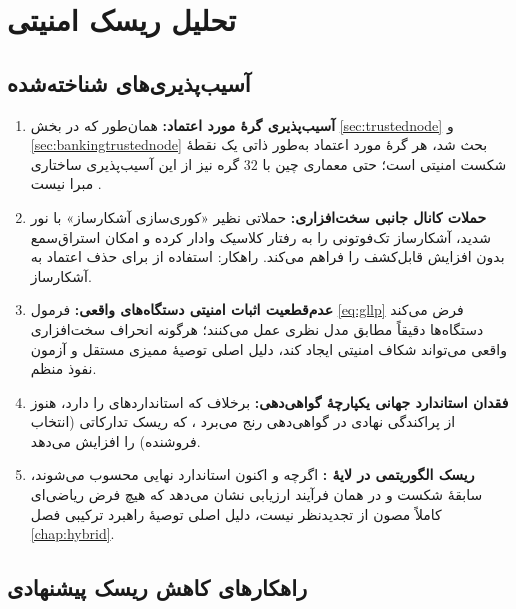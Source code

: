 \chapter{تحلیل ریسک امنیتی}
\label{chap:security}

\section{آسیب‌پذیری‌های شناخته‌شده}

\begin{enumerate}
\item \textbf{آسیب‌پذیری گرهٔ مورد اعتماد:} همان‌طور که در بخش \ref{sec:trustednode} و \ref{sec:bankingtrustednode} بحث شد، هر گرهٔ مورد اعتماد به‌طور ذاتی یک نقطهٔ شکست امنیتی است؛ حتی معماری چین با $32$ گره نیز از این آسیب‌پذیری ساختاری مبرا نیست \Cite{iiss2026governance}.
\item \textbf{حملات کانال جانبی سخت‌افزاری:} حملاتی نظیر «کوری‌سازی آشکارساز»  با نور شدید، آشکارساز تک‌فوتونی را به رفتار کلاسیک وادار کرده و امکان استراق‌سمع بدون افزایش قابل‌کشف  را فراهم می‌کند. راهکار: استفاده از  برای حذف اعتماد به آشکارساز.
\item \textbf{عدم‌قطعیت اثبات امنیتی دستگاه‌های واقعی:} فرمول \ref{eq:gllp} فرض می‌کند دستگاه‌ها دقیقاً مطابق مدل نظری عمل می‌کنند؛ هرگونه انحراف سخت‌افزاری واقعی می‌تواند شکاف امنیتی ایجاد کند، دلیل اصلی توصیهٔ ممیزی مستقل و آزمون نفوذ منظم.
\item \textbf{فقدان استاندارد جهانی یکپارچهٔ گواهی‌دهی:} برخلاف  که استانداردهای  را دارد،  هنوز از پراکندگی نهادی در گواهی‌دهی رنج می‌برد \Cite{iiss2026governance}، که ریسک تدارکاتی (انتخاب فروشنده) را افزایش می‌دهد.
\item \textbf{ریسک الگوریتمی در لایهٔ :} اگرچه  و  اکنون استاندارد نهایی محسوب می‌شوند، سابقهٔ شکست  و  در همان فرآیند ارزیابی  \Cite{nistir8547} نشان می‌دهد که هیچ فرض ریاضی‌ای کاملاً مصون از تجدیدنظر نیست، دلیل اصلی توصیهٔ راهبرد ترکیبی فصل \ref{chap:hybrid}.
\end{enumerate}

\section{راهکارهای کاهش ریسک پیشنهادی}

